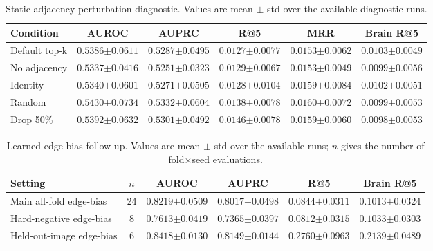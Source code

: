 \documentclass{article}
\begin{document}
\begin{table}[!htbp]
  \centering
  \caption{Static adjacency perturbation diagnostic. Values are mean $\pm$ std over the available diagnostic runs.}
  \label{tab:adjacency_perturbation}
  \scriptsize
  \setlength{\tabcolsep}{4pt}
  \renewcommand{\arraystretch}{1.15}
  \begin{tabular}{lccccc}
    \toprule
    Condition & AUROC & AUPRC & R@5 & MRR & Brain R@5 \\
    \midrule
    Default top-k & $0.5386{\scriptstyle\pm0.0611}$ & $0.5287{\scriptstyle\pm0.0495}$ & $0.0127{\scriptstyle\pm0.0077}$ & $0.0153{\scriptstyle\pm0.0062}$ & $0.0103{\scriptstyle\pm0.0049}$ \\
    No adjacency & $0.5337{\scriptstyle\pm0.0416}$ & $0.5251{\scriptstyle\pm0.0323}$ & $0.0129{\scriptstyle\pm0.0067}$ & $0.0153{\scriptstyle\pm0.0049}$ & $0.0099{\scriptstyle\pm0.0056}$ \\
    Identity & $0.5340{\scriptstyle\pm0.0601}$ & $0.5271{\scriptstyle\pm0.0505}$ & $0.0128{\scriptstyle\pm0.0104}$ & $0.0159{\scriptstyle\pm0.0084}$ & $0.0102{\scriptstyle\pm0.0051}$ \\
    Random & $0.5430{\scriptstyle\pm0.0734}$ & $0.5332{\scriptstyle\pm0.0604}$ & $0.0138{\scriptstyle\pm0.0078}$ & $0.0160{\scriptstyle\pm0.0072}$ & $0.0099{\scriptstyle\pm0.0053}$ \\
    Drop 50\% & $0.5392{\scriptstyle\pm0.0632}$ & $0.5301{\scriptstyle\pm0.0492}$ & $0.0146{\scriptstyle\pm0.0078}$ & $0.0159{\scriptstyle\pm0.0060}$ & $0.0098{\scriptstyle\pm0.0053}$ \\
    \bottomrule
  \end{tabular}
\end{table}

\begin{table}[!htbp]
  \centering
  \caption{Learned edge-bias follow-up. Values are mean $\pm$ std over the available runs; $n$ gives the number of fold$\times$seed evaluations.}
  \label{tab:edge_bias_followup}
  \scriptsize
  \setlength{\tabcolsep}{4pt}
  \renewcommand{\arraystretch}{1.15}
  \begin{tabular}{lccccc}
    \toprule
    Setting & $n$ & AUROC & AUPRC & R@5 & Brain R@5 \\
    \midrule
    Main all-fold edge-bias & 24 & $0.8219{\scriptstyle\pm0.0509}$ & $0.8017{\scriptstyle\pm0.0498}$ & $0.0844{\scriptstyle\pm0.0311}$ & $0.1013{\scriptstyle\pm0.0324}$ \\
    Hard-negative edge-bias & 8 & $0.7613{\scriptstyle\pm0.0419}$ & $0.7365{\scriptstyle\pm0.0397}$ & $0.0812{\scriptstyle\pm0.0315}$ & $0.1033{\scriptstyle\pm0.0303}$ \\
    Held-out-image edge-bias & 6 & $0.8418{\scriptstyle\pm0.0130}$ & $0.8149{\scriptstyle\pm0.0144}$ & $0.2760{\scriptstyle\pm0.0963}$ & $0.2139{\scriptstyle\pm0.0489}$ \\
    \bottomrule
  \end{tabular}
\end{table}
\end{document}
